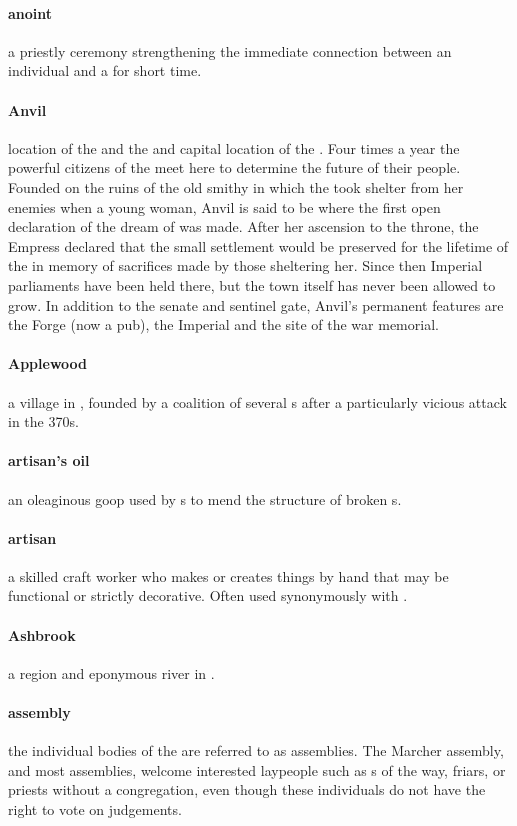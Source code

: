 \paragraph{anoint} a priestly ceremony strengthening the immediate connection between an individual and a  for short time.
\paragraph{Anvil} location of the  and the  and capital location of the . Four times a year the powerful citizens of the  meet here to determine the future of their people. Founded on the ruins of the old smithy in which the  took shelter from her enemies when a young woman, Anvil is said to be where the first open declaration of the dream of  was made. \localpar After her ascension to the throne, the Empress declared that the small settlement would be preserved for the lifetime of the  in memory of sacrifices made by those sheltering her. Since then Imperial parliaments have been held there, but the town itself has never been allowed to grow. In addition to the senate and sentinel gate, Anvil's permanent features are the Forge (now a pub), the Imperial  and the site of the war memorial.%
\paragraph{Applewood} a village in , founded by a coalition of several s after a particularly vicious  attack in the 370s.
\paragraph{artisan's oil} an oleaginous goop used by s to mend the structure of broken s.
\paragraph{artisan} a skilled craft worker who makes or creates things by hand that may be functional or strictly decorative. Often used synonymously with .
\paragraph{Ashbrook} a region and eponymous river in .
\paragraph{assembly} the individual bodies of the  are referred to as assemblies. The Marcher assembly, and most  assemblies, welcome interested laypeople such as s of the way, friars, or priests without a congregation, even though these individuals do not have the right to vote on judgements.
